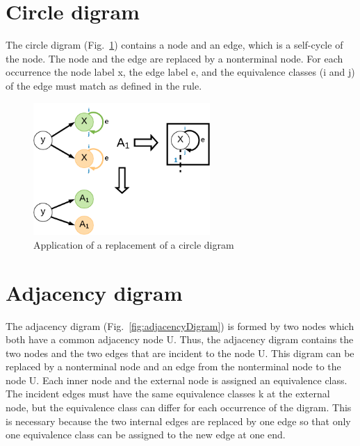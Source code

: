 \section{Circle digram}
\label{sec:circleDigram}



The circle digram (Fig.~\ref{fig:circleDigram}) contains a node and an edge, which is a self-cycle of the node. The node and the edge are replaced by a nonterminal node. For each occurrence the node label x, the edge label e, and the equivalence classes (i and j) of the edge must match as defined in the rule.

\begin{figure}[h]
	\centering
	\includegraphics[width=0.6\textwidth]{chapters/imgConcept/circleDigram}
	\caption{Application of a replacement of a circle digram}
	\label{fig:circleDigram}
\end{figure}



\section{Adjacency digram}
\label{sec:adjacencyDigram}



The adjacency digram (Fig.~\ref{fig:adjacencyDigram}) is formed by two nodes which both have a common adjacency node U. Thus, the adjacency digram contains the two nodes and the two edges that are incident to the node U. This digram can be replaced by a nonterminal node and an edge from the nonterminal node to the node U. Each inner node and the external node is assigned an equivalence class.
The incident edges must have the same equivalence classes k at the external node, but the equivalence class can differ for each occurrence of the digram. This is necessary because the two internal edges are replaced by one edge so that only one equivalence class can be assigned to the new edge at one end.

